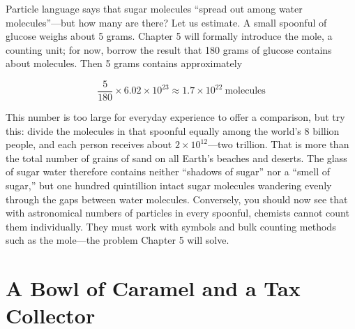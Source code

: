 \begin{qiaoliang}
Particle language says that sugar molecules ``spread out among water molecules''---but how many are there? Let us estimate. A small spoonful of glucose weighs about 5 grams. Chapter 5 will formally introduce the mole, a counting unit; for now, borrow the result that 180 grams of glucose contains about  molecules. Then 5 grams contains approximately

\[\frac{5}{180}\times 6.02\times 10^{23}\approx 1.7\times 10^{22}\ \text{molecules}\]

This number is too large for everyday experience to offer a comparison, but try this: divide the molecules in that spoonful equally among the world's 8 billion people, and each person receives about $2\times 10^{12}$---two trillion. That is more than the total number of grains of sand on all Earth's beaches and deserts. The glass of sugar water therefore contains neither ``shadows of sugar'' nor a ``smell of sugar,'' but one hundred quintillion intact sugar molecules wandering evenly through the gaps between water molecules. Conversely, you should now see that with astronomical numbers of particles in every spoonful, chemists cannot count them individually. They must work with symbols and bulk counting methods such as the mole---the problem Chapter 5 will solve.
\end{qiaoliang}

\section{A Bowl of Caramel and a Tax Collector}

